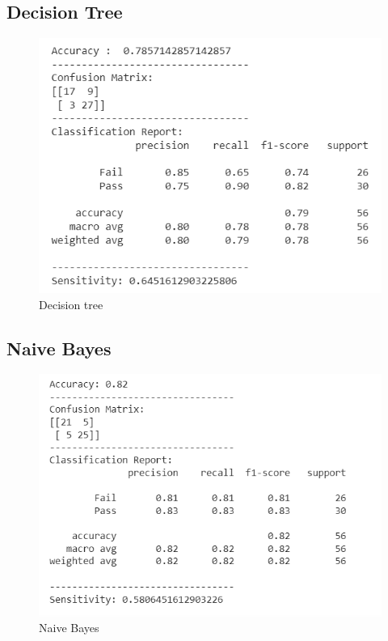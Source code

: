 \documentclass[12pt,a4paper]{article}
\begin{document}
\subsection{Decision Tree}
\begin{figure}[h]
    \centering
    \includegraphics[scale=0.60]{Other/After_Decision Tree.png}
    \caption{Decision tree}
\end{figure}
\newpage
\subsection{Naive Bayes}
\begin{figure}[h]
    \centering
    \includegraphics[scale=0.60]{Other/After_Bayesian.png}
    \caption{Naive Bayes}
\end{figure}
\end{document}
